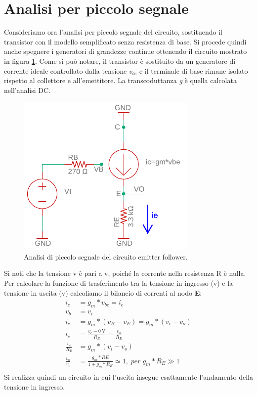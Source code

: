 \section{Analisi per piccolo segnale}
Consideriamo ora l'analisi per piccolo segnale del circuito, sostituendo il transistor con il modello semplificato senza resistenza di base. Si procede quindi anche spegnere i generatori di grandezze continue ottenendo il circuito mostrato in figura \ref{fig:emitterfollwer_piccolo segnale}. Come si può notare, il transistor è sostituito da un generatore di corrente ideale controllato dalla tensione $v_{be}$ e il terminale di base rimane isolato rispetto al collettore e all'emettitore. La transcoduttanza \textit{g} è quella calcolata nell'analisi DC.
\begin{figure}[h!]
	\centering
	\includegraphics[width=0.4\linewidth]{./OtherFiles/Laboratorio 1/emitter follower_piccolo segnale_printout}
	\caption{Analisi di piccolo segnale del circuito emitter follower.}
	\label{fig:emitterfollwer_piccolo segnale}
\end{figure}
Si noti che la tensione v è pari a v, poiché la corrente nella resistenza R è nulla.
Per calcolare la funzione di trasferimento tra la tensione in ingresso (v) e la tensione in uscita (v) calcoliamo il bilancio di correnti al nodo \textbf{E}:
\begin{equation}
	\begin{split}
		i_c&=g_m * v_{be} = i_e \\ 
		v_b&=v_i \\
		i_c&=g_m*(v_B-v_E)=g_m*(v_i-v_o) \\
		i_e&=\frac{v_e-\SI{0}{\volt}}{R_E}=\frac{v_o}{R_E} \\
		\frac{v_o}{R_E}&=g_m*(v_i-v_o) \\
		\frac{v_o}{v_i}&=\frac{g_m*RE}{1+g_m*R_E}\simeq 1, \; per \; g_m*R_E\gg 1 \\
	\end{split}
\end{equation}
Si realizza quindi un circuito in cui l'uscita insegue esattamente l'andamento della tensione in ingresso.

